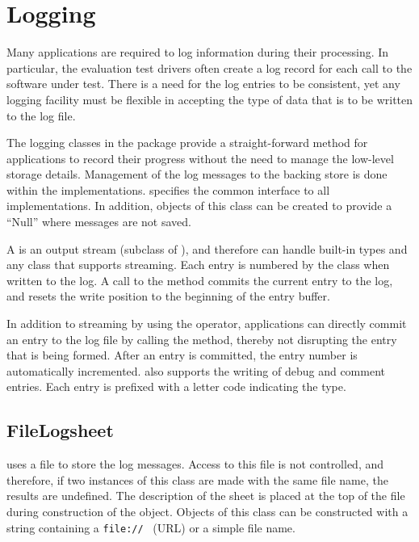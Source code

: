 \section{Logging}
\label{sec-logging}

Many applications are required to log information during their processing. In
particular, the evaluation test drivers often create a log record for each
call to the software under test. There is a need for the log entries to be
consistent, yet any logging facility must be flexible in accepting the type of
data that is to be written to the log file.

The logging classes in the  package provide a straight-forward
method for applications to record their progress without the need to manage the
low-level storage details. Management of the log messages to the backing store
is done within the  implementations.  specifies
the common interface to all implementations. In addition, objects of this class
can be created to provide a ``Null''  where messages are
not saved.

A  is an output stream (subclass of ),
and therefore can handle built-in types and any class that supports streaming.
Each entry is numbered by the  class when written to the log.
A call to the
 method commits the current entry to the log, and
resets the write position to the beginning of the entry buffer.


In addition to streaming by using the  operator, 
applications can directly commit an entry to the log file by calling the 
 method, thereby not disrupting the entry that is being formed.
After an entry is committed, the entry number is automatically incremented.
 also supports the writing of debug and comment entries.
Each entry is prefixed with a letter code indicating the type.

\subsection{FileLogsheet}
\label{sec-filelogsheet}

 uses a file to store the log messages. Access to this
file is not controlled, and therefore, if two instances of this class
are made with the same file name, the results are undefined. 
The description of the sheet is placed at the top of the file during
construction of the object. Objects of this class can be constructed with
a string containing a \verb=file://= \URL~(URL) or a simple file name.

